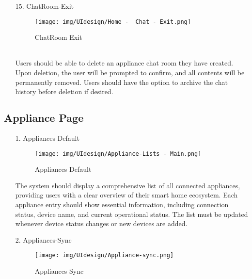 \documentclass[conference]{IEEEtran}
\begin{document}
\begin{enumerate}
\begin{itemize}
\begin{itemize}
\begin{enumerate}
\begin{enumerate}
    \item[15.] ChatRoom-Exit
    \begin{figure}[h]
        {\centering
        \hspace{4cm}
        \begin{minipage}{0.4\columnwidth}
            \texttt{[image: img/UIdesign/Home - \_Chat - Exit.png]}
            \caption{ChatRoom Exit}
        \end{minipage}}
    \end{figure}
    \\ Users should be able to delete an appliance chat room they have created. Upon deletion, the user will be prompted to confirm, and all contents will be permanently removed. Users should have the option to archive the chat history before deletion if desired.
\end{enumerate}

\clearpage

\subsection{Appliance Page}
    \begin{enumerate}
    \item[1.] Appliances-Default
    \begin{figure}[h]
        {\centering
        \hspace{4cm}
        \begin{minipage}{0.4\columnwidth}
            \texttt{[image: img/UIdesign/Appliance-Lists - Main.png]}
            \caption{Appliances Default}
        \end{minipage}}
    \end{figure}

    The system should display a comprehensive list of all connected appliances, providing users with a clear overview of their smart home ecosystem. Each appliance entry should show essential information, including connection status, device name, and current operational status. The list must be updated whenever device status changes or new devices are added. \\ 
\end{enumerate}

\begin{enumerate}
    \item[2.] Appliances-Sync
    \begin{figure}[h]
        {\centering
        \hspace{4cm}
        \begin{minipage}{0.2\columnwidth}
            \texttt{[image: img/UIdesign/Appliance-sync.png]}
            \captionsetup{width=2.5\linewidth}
            \caption{Appliances Sync}
        \end{minipage}}
    \end{figure}


\end{enumerate}
\end{enumerate}
\end{itemize}
\end{itemize}
\end{enumerate}
\end{document}
